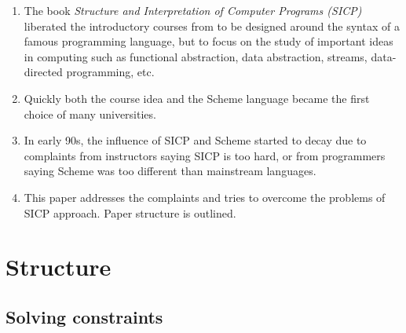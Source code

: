 \documentclass{article}
\begin{document}
\begin{enumerate}
\item The book \textit{Structure and Interpretation of Computer
  Programs (SICP)} liberated the introductory courses from to be
  designed around the syntax of a famous programming language, but to
  focus on the study of important ideas in computing such as
  functional abstraction, data abstraction, streams, data-directed
  programming, etc.
\item Quickly both the course idea and the Scheme language became the
  first choice of many universities.
\item In early 90s, the influence of SICP and Scheme started to decay
  due to complaints from instructors saying SICP is too hard, or from
  programmers saying Scheme was too different than mainstream languages.
\item This paper addresses the complaints and tries to overcome the
  problems of SICP approach. Paper structure is outlined.
\end{enumerate}

\section{Structure}

\subsection{Solving constraints}
\end{document}
